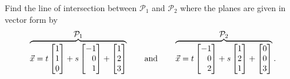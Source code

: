 \begin{example}
	Find the line of intersection between $\mathcal P_1$ and $\mathcal P_2$ where the planes
	are given in vector form by
	\[
		\overbrace{\vec x=t\mat{1\\1\\0}+s\mat{-1\\0\\1}+\mat{1\\2\\3}}^{\displaystyle\mathcal P_1}
		\qquad\text{and}\qquad
		\overbrace{\vec x=t\mat{-1\\0\\2}+s\mat{1\\2\\1}+\mat{0\\0\\3}}^{\displaystyle\mathcal P_2}.
	\]


\end{example}
